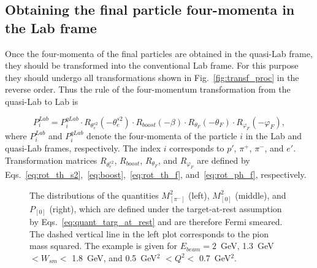 \subsection{Obtaining the final particle four-momenta in the Lab frame}


Once the four-momenta of the final particles are obtained in the quasi-Lab frame, they should be transformed into the conventional Lab frame. For this purpose they should undergo all transformations shown in Fig.~\ref{fig:transf_proc} in the reverse order. Thus the rule of the four-momentum transformation from the quasi-Lab to Lab is 



\begin{equation}\label{eq:qlab_lab_tranf}
P^{Lab}_{i} = P^{qLab}_{i}\cdot R_{\theta_{e}^{s2}}(-\theta_{e}^{s2})\cdot R_{boost}(-\beta) \cdot R_{\theta_{F}}(-\theta_{F}) \cdot R_{\varphi_{F}}(-\varphi_{F}),
\end{equation}
where $P^{Lab}_{i}$ and $P^{qLab}_{i}$ denote the four-momenta of the particle $i$ in the Lab and quasi-Lab frames, respectively. The index $i$ corresponds to $p'$, $\pi^{+}$, $\pi^{-}$, and $e'$. Transformation matrices $R_{\theta_{e}^{s2}}$, $R_{boost}$, $R_{\theta_{F}}$, and $R_{\varphi_{F}}$ are defined by Eqs.~\eqref{eq:rot_th_s2},~\eqref{eq:boost},~\eqref{eq:rot_th_f}, and~\eqref{eq:rot_ph_f}, respectively.


\begin{figure}[!ht]
\begin{center}
\end{center}
\caption{\small The distributions of the quantities $M^{2}_{[\pi^{-}]}$ (left), $M^{2}_{[0]}$ (middle), and $P_{[0]}$ (right), which are defined under the target-at-rest assumption by Eqs.~\eqref{eq:quant_targ_at_rest} and are therefore Fermi smeared. The dashed vertical line in the left plot corresponds to the pion mass squared. The example is given for $E_{beam} = 2$~GeV, 1.3~GeV $< W_{sm} <$ 1.8~GeV, and 0.5~GeV$^2$ $< Q^{2}<$ 0.7~GeV$^2$. }
\label{fig:miss_fermi_smear}
\end{figure}

